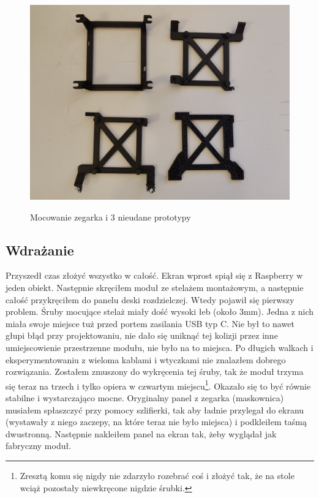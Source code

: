 \documentclass[declaration,shortabstract, inz]{iithesis}
\begin{document}
    \begin{figure}[htp]
        \centering
        \includegraphics[width=12cm]{images/mounting.jpg}
        \label{fig:mounting}
        \caption{Mocowanie zegarka i 3 nieudane prototypy}
    \end{figure}
    \FloatBarrier


\subsection{Wdrażanie}
    Przyszedł czas złożyć wszystko w całość. Ekran wprost spiął się z Raspberry w jeden obiekt. Następnie skręciłem moduł ze stelażem montażowym, a następnie całość przykręciłem do panelu deski rozdzielczej. Wtedy pojawił się pierwszy problem. Śruby mocujące stelaż miały dość wysoki łeb (około 3mm). Jedna z nich miała swoje miejsce tuż przed portem zasilania USB typ C. Nie był to nawet głupi błąd przy projektowaniu, nie dało się uniknąć tej kolizji przez inne umiejscowienie przestrzenne modułu, nie było na to miejsca. Po długich walkach i eksperymentowaniu z wieloma kablami i wtyczkami nie znalazłem dobrego rozwiązania. Zostałem zmuszony do wykręcenia tej śruby, tak że moduł trzyma się teraz na trzech i tylko opiera w czwartym miejscu\footnote{Zresztą komu się nigdy nie zdarzyło rozebrać coś i złożyć tak, że na stole wciąż pozostały niewkręcone nigdzie śrubki.}. Okazało się to być równie stabilne i wystarczająco mocne. Oryginalny panel z zegarka (maskownica) musiałem spłaszczyć przy pomocy szlifierki, tak aby ładnie przylegał do ekranu (wystawały z niego zaczepy, na które teraz nie było miejsca) i podkleiłem taśmą dwustronną. Następnie nakleiłem panel na ekran tak, żeby wyglądał jak fabryczny moduł.
    
\end{document}
